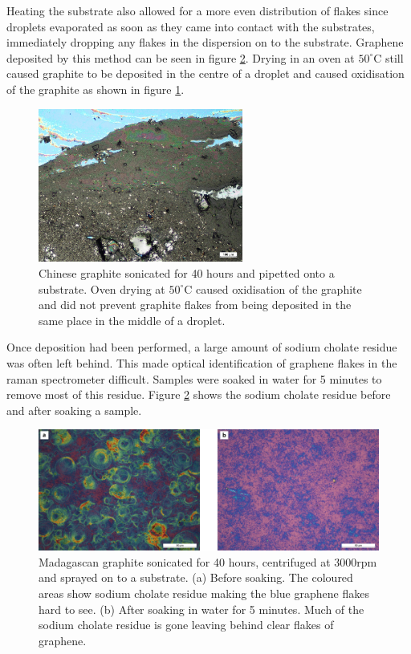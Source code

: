 \documentclass[12pt,titlepage]{article}
\begin{document}
	Heating the substrate also allowed for a more even distribution of flakes since droplets evaporated as soon as they came into contact with the substrates, immediately dropping any flakes in the dispersion on to the substrate. Graphene deposited by this method can be seen in figure \ref{fig:soaking}. Drying in an oven at $50^{\circ}$C still caused graphite to be deposited in the centre of a droplet and caused oxidisation of the graphite as shown in figure \ref{fig:oven}.
	
	\begin{figure}
		\centering
		\includegraphics[width=0.6\textwidth]{figures/oven.jpg}
		\caption[Oxidisation of graphite after oven drying.]{Chinese graphite sonicated for 40 hours and pipetted onto a substrate. Oven drying at $50^{\circ}$C caused oxidisation of the graphite and did not prevent graphite flakes from being deposited in the same place in the middle of a droplet.}
		\label{fig:oven}
	\end{figure}
	
	Once deposition had been performed, a large amount of sodium cholate residue was often left behind. This made optical identification of graphene flakes in the raman spectrometer difficult. Samples were soaked in water for 5 minutes to remove most of this residue. Figure \ref{fig:soaking} shows the sodium cholate residue before and after soaking a sample.
	
	\begin{figure}
		\centering
		\includegraphics[width=1\textwidth]{figures/soaking.png}
		\caption[Comparison for soaking of samples to remove NaC residue.]{Madagascan graphite sonicated for 40 hours, centrifuged at 3000rpm and sprayed on to a substrate. (a) Before soaking. The coloured areas show sodium cholate residue making the blue graphene flakes hard to see. (b) After soaking in water for 5 minutes. Much of the sodium cholate residue is gone leaving behind clear flakes of graphene.}
		\label{fig:soaking}
	\end{figure}
	
\end{document}

